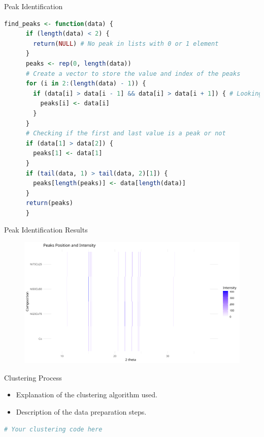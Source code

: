 \documentclass{beamer}
\begin{document}
\begin{frame}[fragile]{Peak Identification}

    \begin{lstlisting}[language=R, basicstyle=\tiny\ttfamily]
    find_peaks <- function(data) {
      if (length(data) < 2) {
        return(NULL) # No peak in lists with 0 or 1 element
      }
      peaks <- rep(0, length(data))
      # Create a vector to store the value and index of the peaks
      for (i in 2:(length(data) - 1)) {
        if (data[i] > data[i - 1] && data[i] > data[i + 1]) { # Looking for a peak
          peaks[i] <- data[i]
        }
      }
      # Checking if the first and last value is a peak or not
      if (data[1] > data[2]) {
        peaks[1] <- data[1]
      }
      if (tail(data, 1) > tail(data, 2)[1]) {
        peaks[length(peaks)] <- data[length(data)]
      }
      return(peaks)
      }    \end{lstlisting}
\end{frame}

\begin{frame}{Peak Identification Results}
    \begin{figure}
        \includegraphics[width=1.1\textwidth]{../plot/peaks.png}
    \end{figure}
\end{frame}




\begin{frame}[fragile]{Clustering Process}
    \begin{itemize}
        \item Explanation of the clustering algorithm used.
        \item Description of the data preparation steps.
    \end{itemize}

    \begin{lstlisting}[language=R, basicstyle=\small\ttfamily]
    # Your clustering code here
    \end{lstlisting}
\end{frame}
\end{document}
